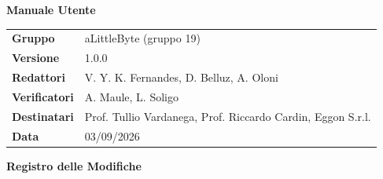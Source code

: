 \documentclass[a4paper,12pt]{article}
\begin{document}
\hypersetup{pageanchor=false}

\thispagestyle{firstpage}

\vspace*{0.5cm}

\begin{center}
    {\LARGE \textbf{Manuale Utente}}
\end{center}

\vspace{1.5cm}

\begin{center}
    \renewcommand{\arraystretch}{1.3}
    \begin{tcolorbox}[
        width=0.92\textwidth,
        colback=gray!6,
        colframe=gray!45,
        boxrule=0.5pt,
        arc=2mm,
        boxsep=0pt,
        left=8pt, right=8pt, top=8pt, bottom=8pt
    ]
        \begin{tabularx}{\linewidth}{>{\bfseries}p{3.5cm} X}
            Gruppo      & aLittleByte (gruppo 19) \\
            Versione    & 1.0.0 \\
            Redattori   & V. Y. K. Fernandes, D. Belluz, A. Oloni\\
            Verificatori&  A. Maule, L. Soligo \\
            Destinatari & Prof. Tullio Vardanega, Prof. Riccardo Cardin, Eggon S.r.l. \\
            Data        & 03/09/2026 \\
        \end{tabularx}
    \end{tcolorbox}
\end{center}

\newpage


\begin{center}
    {\Large \textbf{Registro delle Modifiche}}
\end{center}

\vspace{0.35cm}
\end{document}
